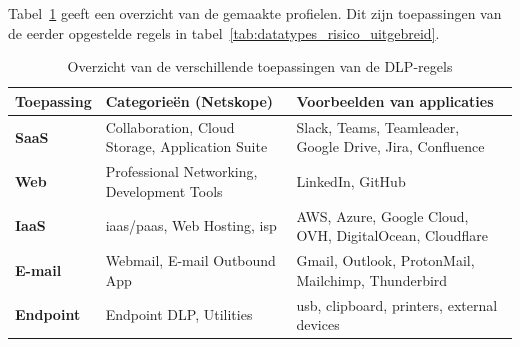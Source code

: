 



\section{}
\label{subsubsec:toepassingen}

Tabel~\ref{tab:toepassingen} geeft een overzicht van de gemaakte profielen. 
Dit zijn toepassingen van de eerder opgestelde regels in tabel~\ref{tab:datatypes_risico_uitgebreid}.

\begin{table}[H]
    \centering
    \small
    \scriptsize
    \begin{tabular}{p{3cm}p{5cm}p{6cm}}
        \toprule
        \textbf{Toepassing} & \textbf{Categorieën (Netskope)} & \textbf{Voorbeelden van applicaties} \\
        \midrule
        \textbf{SaaS}     & Collaboration, Cloud Storage, Application Suite & Slack, Teams, Teamleader, Google Drive, Jira, Confluence \\
        \textbf{Web}      & Professional Networking, Development Tools & LinkedIn, GitHub \\
        \textbf{IaaS}     & \gls{iaas}/\gls{paas}, Web Hosting, \gls{isp} & AWS, Azure, Google Cloud, OVH, DigitalOcean, Cloudflare \\
        \textbf{E-mail}    & Webmail, E-mail Outbound App & Gmail, Outlook, ProtonMail, Mailchimp, Thunderbird \\
        \textbf{Endpoint} & Endpoint DLP, Utilities & \gls{usb}, clipboard, printers, external devices \\
        \bottomrule
    \end{tabular}
    \caption{Overzicht van de verschillende toepassingen van de DLP-regels}
    \label{tab:toepassingen}
\end{table}

